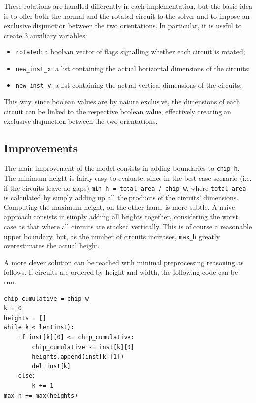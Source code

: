 \documentclass[a4paper, 12pt]{article}
\begin{document}
These rotations are handled differently in each implementation, but the basic idea is to offer both the normal and the rotated circuit to the solver and to impose an exclusive disjunction between the two orientations. In particular, it is useful to create 3 auxiliary variables:

\begin{itemize}
	\item \verb|rotated|: a boolean vector of flags signalling whether each circuit is rotated;
	\item \verb|new_inst_x|: a list containing the actual horizontal dimensions of the circuits;
	\item \verb|new_inst_y|: a list containing the actual vertical dimensions of the circuits;
\end{itemize}


This way, since boolean values are by nature exclusive, the dimensions of each circuit can be linked to the respective boolean value, effectively creating an exclusive disjunction between the two orientations.



\subsection{Improvements}\label{sec:improvements}

The main improvement of the model consists in adding boundaries to \verb|chip_h|. The minimum height is fairly easy to evaluate, since in the best case scenario (i.e. if the circuits leave no gaps) \verb|min_h = total_area / chip_w|, where \verb|total_area| is calculated by simply adding up all the products of the circuits' dimensions. Computing the maximum height, on the other hand, is more subtle. A naive approach consists in simply adding all heights together, considering the worst case as that where all circuits are stacked vertically. This is of course a reasonable upper boundary, but, as the number of circuits increases, \verb|max_h| greatly overestimates the actual height.

A more clever solution can be reached with minimal preprocessing reasoning as follows. If circuits are ordered by height and width, the following code can be run:
\begin{verbatim}
chip_cumulative = chip_w
k = 0
heights = []
while k < len(inst):
    if inst[k][0] <= chip_cumulative:
        chip_cumulative -= inst[k][0]
        heights.append(inst[k][1])
        del inst[k]
    else:
        k += 1
max_h += max(heights)
\end{verbatim}
\end{document}
